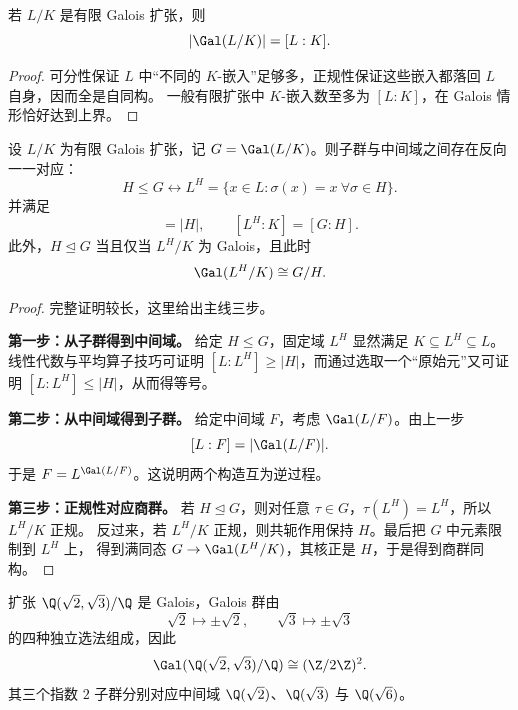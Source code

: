 \begin{proposition}
若 $L/K$ 是有限 Galois 扩张，则
\begin{equation}
  |\Gal(L/K)|=[L:K].
\end{equation}
\end{proposition}

\begin{proof}
可分性保证 $L$ 中“不同的 $K$-嵌入”足够多，正规性保证这些嵌入都落回 $L$ 自身，因而全是自同构。
一般有限扩张中 $K$-嵌入数至多为 $[L:K]$，在 Galois 情形恰好达到上界。
\end{proof}

\begin{theorem}[Galois 对应]
设 $L/K$ 为有限 Galois 扩张，记 $G=\Gal(L/K)$。则子群与中间域之间存在反向一一对应：
\begin{equation}
  H\le G \longleftrightarrow L^H=\{x\in L: \sigma(x)=x\ \forall \sigma\in H\}.
\end{equation}
并满足
\begin{equation}
  [L:L^H]=|H|,
  \qquad
  [L^H:K]=[G:H].
\end{equation}
此外，$H\trianglelefteq G$ 当且仅当 $L^H/K$ 为 Galois，且此时
\begin{equation}
  \Gal(L^H/K)\cong G/H.
\end{equation}
\end{theorem}

\begin{proof}
完整证明较长，这里给出主线三步。

\textbf{第一步：从子群得到中间域。}
给定 $H\le G$，固定域 $L^H$ 显然满足 $K\subseteq L^H\subseteq L$。
线性代数与平均算子技巧可证明 $[L:L^H]\ge |H|$，而通过选取一个“原始元”又可证明
$[L:L^H]\le |H|$，从而得等号。

\textbf{第二步：从中间域得到子群。}
给定中间域 $F$，考虑 $\Gal(L/F)$。由上一步
\[
  [L:F]=|\Gal(L/F)|.
\]
于是 $F=L^{\Gal(L/F)}$。这说明两个构造互为逆过程。

\textbf{第三步：正规性对应商群。}
若 $H\trianglelefteq G$，则对任意 $\tau\in G$，$\tau(L^H)=L^H$，所以 $L^H/K$ 正规。
反过来，若 $L^H/K$ 正规，则共轭作用保持 $H$。最后把 $G$ 中元素限制到 $L^H$ 上，
得到满同态 $G\to \Gal(L^H/K)$，其核正是 $H$，于是得到商群同构。
\end{proof}

\begin{example}
扩张 $\Q(\sqrt 2,\sqrt 3)/\Q$ 是 Galois，Galois 群由
\[
  \sqrt 2\mapsto \pm \sqrt 2,
  \qquad
  \sqrt 3\mapsto \pm \sqrt 3
\]
的四种独立选法组成，因此
\[
  \Gal(\Q(\sqrt 2,\sqrt 3)/\Q)\cong (\Z/2\Z)^2.
\]
其三个指数 $2$ 子群分别对应中间域 $\Q(\sqrt 2)$、$\Q(\sqrt 3)$ 与 $\Q(\sqrt 6)$。
\end{example}

